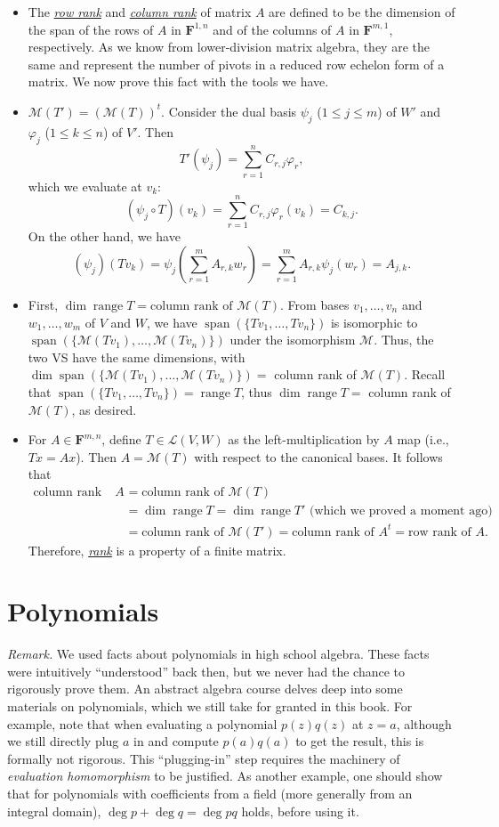 \documentclass{article}
\newcommand{\df}[1]{\ul{\textit{#1}}}
\newcommand{\F}{\mathbf{F}}
\newcommand{\s}{\operatorname{span}}
\renewcommand{\r}{\operatorname{range}}
\renewcommand{\d}{\dim}
\newcommand{\LVW}{\mathcal{L}(V,W)}
\newcommand{\M}{\mathcal{M}}
\newcommand{\bv}{v_1,\dots,v_n}
\renewcommand{\phi}{\varphi}
\begin{document}
\begin{itemize}
    \item The \df{row rank} and \df{column rank} of matrix $A$ are defined to be the dimension of the span of the rows of $A$ in $\F^{1,n}$ and of the columns of $A$ in $\F^{m,1}$, respectively. As we know from lower-division matrix algebra, they are the same and represent the number of pivots in a reduced row echelon form of a matrix. We now prove this fact with the tools we have.
    
    \item $\M(T') = (\M(T))^t$. Consider the dual basis $\psi_j$ ($1 \leq j \leq m$) of $W'$ and $\phi_j$ ($1 \leq k \leq n$) of $V'$. Then $$T'(\psi_j) = \sum_{r=1}^n C_{r,j}\phi_r,$$ which we evaluate at $v_k$: $$(\psi_j \circ T)(v_k) = \sum_{r=1}^n C_{r,j}\phi_r(v_k) = C_{k,j}.$$ On the other hand, we have $$(\psi_j)(Tv_k) = \psi_j(\sum_{r=1}^mA_{r,k}w_r) = \sum_{r=1}^m A_{r,k}\psi_j(w_r) = A_{j,k}.$$
    
    \item First, $\d \r T = \text{column rank of } \M(T)$. From bases $\bv$ and $w_1,\dots,w_m$ of $V$ and $W$, we have $\s(\{Tv_1,\dots,Tv_n\})$ is isomorphic to $\s(\{\M(Tv_1),\dots,\M(Tv_n)\})$ under the isomorphism $\M$. Thus, the two VS have the same dimensions, with $\d \s(\{\M(Tv_1),\dots,\M(Tv_n)\}) = $ column rank of $\M(T)$. Recall that $\s(\{Tv_1,\dots,Tv_n\}) = \r T$, thus $\d \r T = $ column rank of $\M(T)$, as desired.
    
    \item For $A \in \F^{m,n}$, define $T \in \LVW$ as the left-multiplication by $A$ map (i.e., $Tx = Ax$). Then $A = \M(T)$ with respect to the canonical bases. It follows that
    \begin{align*}
        \text{column rank of } A & = \text{column rank of } \M(T) \\
        & = \d \r T = \d \r T' \text{ (which we proved a moment ago)} \\
        & = \text{column rank of } \M(T') = \text{column rank of } A^t
        = \text{row rank of } A.
    \end{align*}
    Therefore, \df{rank} is a property of a finite matrix.
\end{itemize}


\newpage
\section{Polynomials}
\textit{Remark.} We used facts about polynomials in high school algebra. These facts were intuitively ``understood'' back then, but we never had the chance to rigorously prove them. An abstract algebra course delves deep into some materials on polynomials, which we still take for granted in this book. For example, note that when evaluating a polynomial $p(z)q(z)$ at $z = a$, although we still directly plug $a$ in and compute $p(a)q(a)$ to get the result, this is formally not rigorous. This ``plugging-in'' step requires the machinery of \emph{evaluation homomorphism} to be justified. As another example, one should show that for polynomials with coefficients from a field (more generally from an integral domain), $\deg p + \deg q = \deg pq$ holds, before using it.
\end{document}
